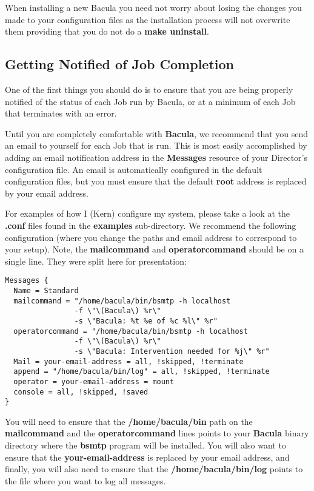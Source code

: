 When installing a new Bacula you need not worry about losing the changes you
made to your configuration files as the installation process will not
overwrite them providing that you do not do a {\bf make uninstall}.

\subsection*{Getting Notified of Job Completion}
\label{notification}

One of the first things you should do is to ensure that you are being properly
notified of the status of each Job run by Bacula, or at a minimum of each Job
that terminates with an error. 

Until you are completely comfortable with {\bf Bacula}, we recommend that you
send an email to yourself for each Job that is run. This is most easily
accomplished by adding an email notification address in the {\bf Messages}
resource of your Director's configuration file. An email is automatically
configured in the default configuration files, but you must ensure that the
default {\bf root} address is replaced by your email address. 

For examples of how I (Kern) configure my system, please take a look at the
{\bf .conf} files found in the {\bf examples} sub-directory. We recommend the
following configuration (where you change the paths and email address to
correspond to your setup). Note, the {\bf mailcommand} and {\bf
operatorcommand} should be on a single line. They were split here for
presentation: 

\footnotesize
\begin{verbatim}
Messages {
  Name = Standard
  mailcommand = "/home/bacula/bin/bsmtp -h localhost
                -f \"\(Bacula\) %r\"
                -s \"Bacula: %t %e of %c %l\" %r"
  operatorcommand = "/home/bacula/bin/bsmtp -h localhost
                -f \"\(Bacula\) %r\"
                -s \"Bacula: Intervention needed for %j\" %r"
  Mail = your-email-address = all, !skipped, !terminate
  append = "/home/bacula/bin/log" = all, !skipped, !terminate
  operator = your-email-address = mount
  console = all, !skipped, !saved
}
\end{verbatim}
\normalsize

You will need to ensure that the {\bf /home/bacula/bin} path on the {\bf
mailcommand} and the {\bf operatorcommand} lines points to your {\bf Bacula}
binary directory where the {\bf bsmtp} program will be installed. You will
also want to ensure that the {\bf your-email-address} is replaced by your
email address, and finally, you will also need to ensure that the {\bf
/home/bacula/bin/log} points to the file where you want to log all messages. 

